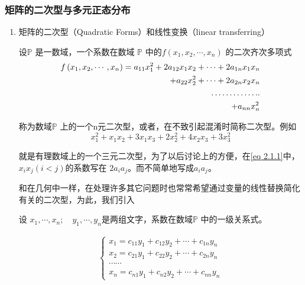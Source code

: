 \subsubsection {矩阵的二次型与多元正态分布}
   
	\begin{enumerate}[ 1) ]
		\item  \setlength{\parindent}{2\ccwd} 矩阵的二次型（Quadratic Forms）和线性变换（linear transferring）
		
		设$ \mathbb{P} $ 是一数域，一个系数在数域 $ \mathbb{P} $ 中的$ f \left(x_{1}, x_{2}, \cdots, x_{n} \right) $ 的二次齐次多项式
		\begin{eqnarray}
			f\left(x_{1}, x_{2}, \cdots, x_{n}\right)  =   
			a_{11} x_{1}^{2}+2 a_{12} x_{1} x_{2}+\cdots+2 a_{1 n} x_{1} x_{n}  \notag \\
			+a_{22} x_{2}^{2}+\cdots+2 a_{2 n} x_{2} x_{n}  \label{eq 2.1.1} \\
			\ldots \ldots \ldots \ldots . .  \notag \\
			+a_{n n} x_{n}^{2}  \notag 
		\end{eqnarray} 
		
		称为数域$ \mathbb{P} $ 上的一个n元二次型，或者，在不致引起混淆时简称二次型。例如
		$$ x_{1}^{2}+x_{1} x_{2}+3 x_{1} x_{3}+2 x_{2}^{2}+4 x_{2} x_{3}+3 x_{3}^{2} $$
		
		就是有理数域上的一个三元二次型，为了以后讨论上的方便，在\eqref{eq 2.1.1}中， $ x_{i} x_{j}(i<j) $的系数写在 $ 2a_{i} a_{j}$。而不简单地写成$ a_{i} a_{j}$。
		
		和在几何中一样，在处理许多其它问题时也常常希望通过变量的线性替换简化有关的二次型，为此，我们引入
		
		\begin{mydef} 
			设 $ x_{1}, \cdots, x_{n} ; \quad y_{1}, \cdots, y_{n} $是两组文字，系数在数域$ \mathbb{P} $ 中的一级关系式。
		\end{mydef}
		
		\vspace{-1em}
		\begin{eqnarray}
		\left\{\begin{array}{l}
		x_{1}  =  c_{11} y_{1}+c_{12} y_{2} +   \cdots + c_{1 n} y_{n}   \\
		x_{2}  =  c_{21} y_{1}+c_{22} y_{2} +   \cdots + c_{2 n} y_{n} \\
		\cdots  \cdots \\
		x_{n}  =  c_{n 1} y_{1}+c_{n 2} y_{2} + \cdots + c_{n n} y_{n}
		\end{array}\right.
		\label{eq 2.1.2}
		\end{eqnarray}
		

\end{enumerate}

